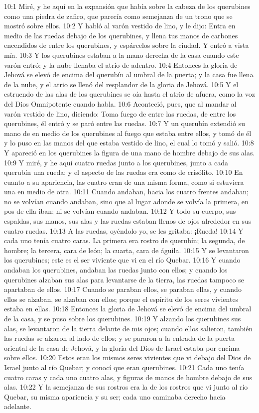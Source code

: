 10:1 Miré, y he aquí en la expansión que había sobre la cabeza de los querubines como una piedra de zafiro, que parecía como semejanza de un trono que se mostró sobre ellos. 
10:2 Y habló al varón vestido de lino, y le dijo: Entra en medio de las ruedas debajo de los querubines, y llena tus manos de carbones encendidos de entre los querubines, y espárcelos sobre la ciudad.  Y entró a vista mía.   
10:3 Y los querubines estaban a la mano derecha de la casa cuando este varón entró; y la nube llenaba el atrio de adentro.   
10:4 Entonces la gloria de Jehová se elevó de encima del querubín al umbral de la puerta; y la casa fue llena de la nube, y el atrio se llenó del resplandor de la gloria de Jehová.   
10:5 Y el estruendo de las alas de los querubines se oía hasta el atrio de afuera, como la voz del Dios Omnipotente cuando habla.   
10:6 Aconteció, pues, que al mandar al varón vestido de lino, diciendo: Toma fuego de entre las ruedas, de entre los querubines, él entró y se paró entre las ruedas.   
10:7 Y un querubín extendió su mano de en medio de los querubines al fuego que estaba entre ellos, y tomó de él y lo puso en las manos del que estaba vestido de lino, el cual lo tomó y salió.   
10:8 Y apareció en los querubines la figura de una mano de hombre debajo de sus alas.   
10:9 Y miré, y he aquí cuatro ruedas junto a los querubines, junto a cada querubín una rueda; y el aspecto de las ruedas era como de crisólito.   
10:10 En cuanto a su apariencia, las cuatro eran de una misma forma, como si estuviera una en medio de otra.   
10:11 Cuando andaban, hacia los cuatro frentes andaban; no se volvían cuando andaban, sino que al lugar adonde se volvía la primera, en pos de ella iban; ni se volvían cuando andaban.   
10:12 Y todo su cuerpo, sus espaldas, sus manos, sus alas y las ruedas estaban llenos de ojos alrededor  en sus cuatro ruedas.   
10:13 A las ruedas, oyéndolo yo, se les gritaba: ¡Rueda! 
10:14 Y cada uno tenía cuatro caras. La primera era rostro de querubín; la segunda, de hombre; la tercera, cara de león; la cuarta, cara de águila. 
10:15 Y se levantaron los querubines; este es el ser viviente que vi en el río Quebar.   
10:16 Y cuando andaban los querubines, andaban las ruedas junto con ellos; y cuando los querubines alzaban sus alas para levantarse de la tierra, las ruedas tampoco se apartaban de ellos.   
10:17 Cuando se paraban ellos, se paraban ellas, y cuando ellos se alzaban, se alzaban con ellos; porque el espíritu de los seres vivientes estaba en ellas.   
10:18 Entonces la gloria de Jehová se elevó de encima del umbral de la casa, y se puso sobre los querubines.   
10:19 Y alzando los querubines sus alas, se levantaron de la tierra delante de mis ojos; cuando ellos salieron, también las ruedas se alzaron al lado de ellos; y se pararon a la entrada de la puerta oriental de la casa de Jehová, y la gloria del Dios de Israel estaba por encima sobre ellos.   
10:20 Estos eran los mismos seres vivientes que vi debajo del Dios de Israel junto al río Quebar; y conocí que eran querubines.   
10:21 Cada uno tenía cuatro caras y cada uno cuatro alas, y figuras de manos de hombre debajo de sus alas.   
10:22 Y la semejanza de sus rostros era la de los rostros que vi junto al río Quebar, su misma apariencia y su ser; cada uno caminaba derecho hacia adelante.   

